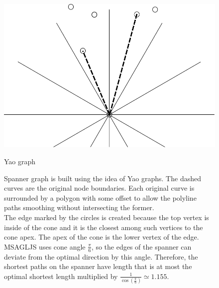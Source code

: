 \documentclass{gd-llncs}
\begin{document}
\begin{figure}[]
  \centering
  \begin{minipage}[b]{0.5\textwidth}
    \includegraphics[width=\textwidth]{yao.pdf}
    \caption{\small{Yao graph}}
    \label{fig:yao}
  \end{minipage}
  \vfill
  \begin{minipage}[b]{\textwidth}
    
    \caption{\small{Spanner graph is built using the idea of Yao graphs. The dashed curves are the original node boundaries. Each original curve is surrounded by a polygon with some offset to allow the polyline paths smoothing without intersecting the former. \\
        The edge marked by the circles is created because the top vertex is inside of the cone and it is the closest among such vertices to the cone apex. The apex of the cone is the lower vertex of the edge. \\MSAGLJS uses cone angle $\frac{\pi}{6}$, so the edges of the spanner can deviate from the optimal direction by this angle. Therefore, the shortest paths on the spanner have length that is at most the optimal shortest length multiplied by $\frac{1}{\cos(\frac{\pi}{6})} \simeq 1.155$.}
    }
    \label{fig:spanner}
  \end{minipage}
\end{figure}
\end{document}

